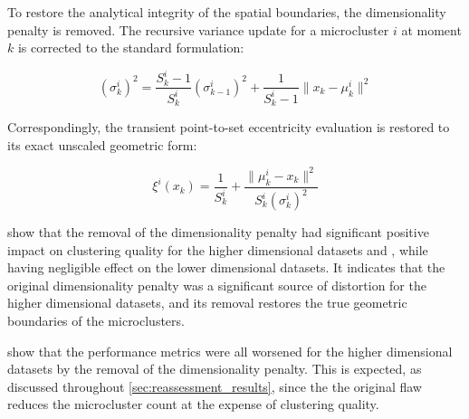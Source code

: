 To restore the analytical integrity of the spatial boundaries, the dimensionality penalty is removed. The recursive variance update for a microcluster $i$ at moment $k$ is corrected to the standard formulation:

$$ \left(\sigma^i_k\right)^2 = \frac{S^i_k - 1}{S^i_k} \left(\sigma^i_{k-1}\right)^2 + \frac{1}{S^i_k - 1} \lVert x_k - \mu^i_k \rVert^2 $$

Correspondingly, the transient point-to-set eccentricity evaluation is restored to its exact unscaled geometric form:

$$ \xi^i(x_k) = \frac{1}{S^i_k} + \frac{\lVert \mu^i_k - x_k \rVert^2}{S^i_k \left(\sigma^i_k\right)^2} $$

 show that the removal of the dimensionality penalty had significant positive impact on clustering quality for the higher dimensional datasets  and , while having negligible effect on the lower dimensional datasets. It indicates that the original dimensionality penalty was a significant source of distortion for the higher dimensional datasets, and its removal restores the true geometric boundaries of the microclusters.






 show that the performance metrics were all worsened for the higher dimensional datasets by the removal of the dimensionality penalty. This is expected, as discussed throughout \cref{sec:reassessment_results}, since the the original flaw reduces the microcluster count at the expense of clustering quality.








